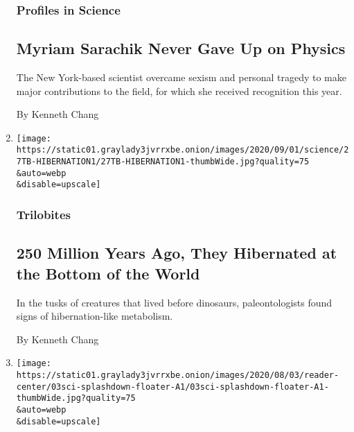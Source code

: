 \begin{enumerate}
  \hypertarget{profiles-in-science}{%
  \subsubsection{Profiles in Science}\label{profiles-in-science}}

  \hypertarget{myriam-sarachik-never-gave-up-on-physics}{%
  \subsection{Myriam Sarachik Never Gave Up on
  Physics}\label{myriam-sarachik-never-gave-up-on-physics}}

  The New York-based scientist overcame sexism and personal tragedy to
  make major contributions to the field, for which she received
  recognition this year.

  By Kenneth Chang
\item
  \href{/2020/08/27/science/fossil-hibernation.html}{}

  \texttt{[image: https://static01.graylady3jvrrxbe.onion/images/2020/09/01/science/27TB-HIBERNATION1/27TB-HIBERNATION1-thumbWide.jpg?quality=75\\\&auto=webp\\\&disable=upscale]}

  \hypertarget{trilobites-1}{%
  \subsubsection{Trilobites}\label{trilobites-1}}

  \hypertarget{250-million-years-ago-they-hibernated-at-the-bottom-of-the-world}{%
  \subsection{250 Million Years Ago, They Hibernated at the Bottom of
  the
  World}\label{250-million-years-ago-they-hibernated-at-the-bottom-of-the-world}}

  In the tusks of creatures that lived before dinosaurs, paleontologists
  found signs of hibernation-like metabolism.

  By Kenneth Chang
\item
  \href{/2020/08/02/science/spacex-astronauts-splashdown.html}{}

  \texttt{[image: https://static01.graylady3jvrrxbe.onion/images/2020/08/03/reader-center/03sci-splashdown-floater-A1/03sci-splashdown-floater-A1-thumbWide.jpg?quality=75\\\&auto=webp\\\&disable=upscale]}

  \hypertarget{thanks-for-flying-spacex-nasa-astronauts-safely-splash-down-after-journey-from-orbit}{%
}
\end{enumerate}
